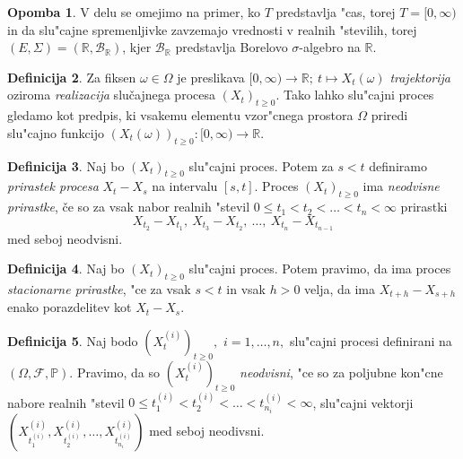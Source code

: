 \documentclass[12pt, a4paper, reqno]{amsart}
\theoremstyle{definition}
\newtheorem{definicija}{Definicija}[section]
\newtheorem{opomba}[definicija]{Opomba}
\theoremstyle{plain}
\newcommand{\R}{\mathbb{R}}
\newcommand{\F}{\mathcal{F}}
\newcommand{\B}{\mathcal{B}}
\newcommand{\Prob}{\mathbb{P}}
\newcommand{\1}{\mathds{1}}
\begin{document}
    \begin{opomba}
        V delu se omejimo na primer, ko $T$ predstavlja "cas, torej $T = [0, \infty)$ in da slu"cajne
        spremenljivke 
        zavzemajo vrednosti v realnih "stevilih, torej $(E, \Sigma) = (\R, \B_{\R})$, kjer $\B_\R$ 
        predstavlja Borelovo $\sigma$-algebro na $\R$.
        \label{op:Konvencije}
    \end{opomba}


    \begin{definicija}
        Za fiksen $\omega \in \Omega$ je preslikava 
        $[0, \infty) \rightarrow \mathbb{R}; \ t \mapsto X_t(\omega)$ 
        \textit{trajektorija} oziroma \textit{realizacija} slučajnega procesa $(X_t)_{t\geq0}$.
        Tako lahko slu"cajni proces gledamo kot predpis, ki vsakemu elementu vzor"cnega prostora 
        $\Omega$ priredi slu"cajno funkcijo
        $(X_t(\omega))_{t\geq0}: [0, \infty) \rightarrow \mathbb{R}$.
        \label{def:realizac}
    \end{definicija}

    \begin{definicija}
        Naj bo $(X_t)_{t\geq0}$ slu"cajni proces. Potem za $s < t$ definiramo
        \textit{prirastek procesa} $X_t - X_s$ na intervalu $[s, t]$. Proces $(X_t)_{t\geq0}$ ima 
        \textit{neodvisne prirastke}, če so za vsak nabor realnih "stevil
        $0 \leq t_1 < t_2 < \ldots < t_n < \infty$ prirastki
        $$
            X_{t_2} - X_{t_1}, \ X_{t_3} - X_{t_2}, \ \ldots, \ X_{t_n} - X_{t_{n-1}}
        $$
        med seboj neodvisni.
        \label{def:prirastek}
    \end{definicija}

    \begin{definicija}
        Naj bo $(X_t)_{t\geq0}$ slu"cajni proces. Potem pravimo, da ima proces
        \textit{stacionarne prirastke}, "ce za vsak $s < t$ in vsak $h > 0$ velja, 
        da ima $X_{t+h} - X_{s+h}$ enako porazdelitev kot $X_t - X_s$.
        \label{def:stacPrir}
    \end{definicija}

    \begin{definicija}
        Naj bodo $(X_t^{(i)})_{t\geq0},$ $i=1, \dots, n,$ slu"cajni procesi definirani na 
        $(\Omega, \F, \Prob)$. Pravimo, da so $(X_t^{(i)})_{t\geq0}$ \textit{neodvisni}, 
        "ce so za poljubne kon"cne nabore realnih "stevil $0 \leq t_1^{(i)} < t_2^{(i)} < \ldots < t_{n_i}^{(i)} < \infty$, 
        slu"cajni vektorji
        $(X_{t_1^{(i)}}^{(i)}, X_{t_2^{(i)}}^{(i)}, \ldots, X_{t_{n_i}^{(i)}}^{(i)})$ med seboj neodivsni. 
        \label{def:neodvisnostProcesov}
    \end{definicija}
\end{document}
